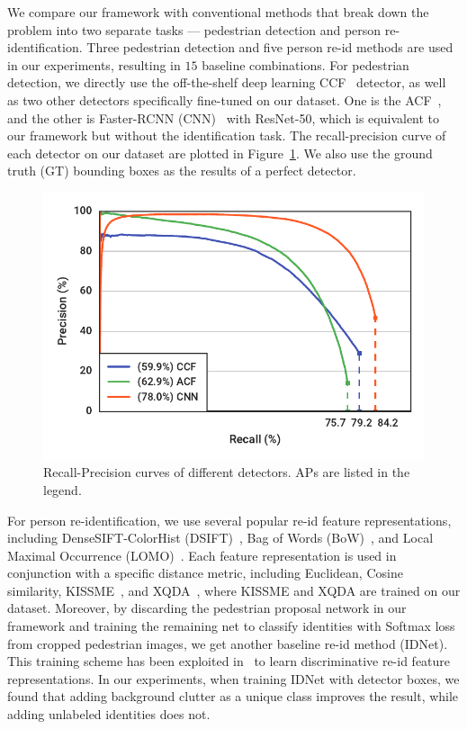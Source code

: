 We compare our framework with conventional methods that break down the problem into two separate tasks --- pedestrian detection and person re-identification. Three pedestrian detection and five person re-id methods are used in our experiments, resulting in $15$ baseline combinations. For pedestrian detection, we directly use the off-the-shelf deep learning CCF~\cite{yang2015convolutional} detector, as well as two other detectors specifically fine-tuned on our dataset. One is the ACF~\cite{dollar2014fast}, and the other is Faster-RCNN (CNN)~\cite{ren2015faster} with ResNet-50, which is equivalent to our framework but without the identification task. The recall-precision curve of each detector on our dataset are plotted in Figure~\ref{fig:ps-detector-pr-curves}. We also use the ground truth (GT) bounding boxes as the results of a perfect detector.
\begin{figure}[t]
\begin{center}
\includegraphics[width=1.0\linewidth]{figures/person_search/detector-pr-curves.pdf}
\end{center}
\caption{Recall-Precision curves of different detectors. APs are listed in the legend.}
\label{fig:ps-detector-pr-curves}
\end{figure}

For person re-identification, we use several popular re-id feature representations, including DenseSIFT-ColorHist (DSIFT)~\cite{zhao2013unsupervised}, Bag of Words (BoW)~\cite{zheng2015scalable}, and Local Maximal Occurrence (LOMO)~\cite{liao2015person}. Each feature representation is used in conjunction with a specific distance metric, including Euclidean, Cosine similarity, KISSME~\cite{koestinger2012large}, and XQDA~\cite{liao2015person}, where KISSME and XQDA are trained on our dataset. Moreover, by discarding the pedestrian proposal network in our framework and training the remaining net to classify identities with Softmax loss from cropped pedestrian images, we get another baseline re-id method (IDNet). This training scheme has been exploited in~\cite{xiao2016learning} to learn discriminative re-id feature representations. In our experiments, when training IDNet with detector boxes, we found that adding background clutter as a unique class improves the result, while adding unlabeled identities does not.

